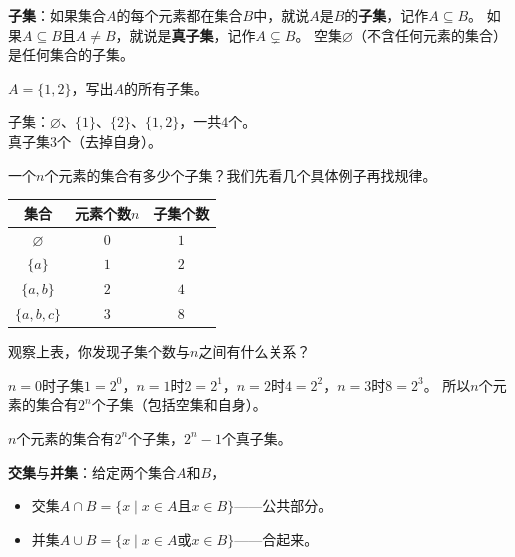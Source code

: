 
\textbf{子集}：如果集合$A$的每个元素都在集合$B$中，就说$A$是$B$的\textbf{子集}，记作$A\subseteq B$。
如果$A\subseteq B$且$A\neq B$，就说是\textbf{真子集}，记作$A\subsetneq B$。
空集$\varnothing$（不含任何元素的集合）是任何集合的子集。

\begin{example}
$A=\{1,2\}$，写出$A$的所有子集。
\end{example}
\begin{solution}
子集：$\varnothing$、$\{1\}$、$\{2\}$、$\{1,2\}$，一共$4$个。\\
真子集$3$个（去掉自身）。
\end{solution}

一个$n$个元素的集合有多少个子集？我们先看几个具体例子再找规律。

\begin{center}
\begin{tabular}{c|c|c}
集合 & 元素个数$n$ & 子集个数 \\ \hline
$\varnothing$ & $0$ & $1$ \\
$\{a\}$ & $1$ & $2$ \\
$\{a,b\}$ & $2$ & $4$ \\
$\{a,b,c\}$ & $3$ & $8$
\end{tabular}
\end{center}

\begin{example}
观察上表，你发现子集个数与$n$之间有什么关系？
\end{example}
\begin{solution}
$n=0$时子集$1=2^0$，$n=1$时$2=2^1$，$n=2$时$4=2^2$，$n=3$时$8=2^3$。
所以$n$个元素的集合有$2^n$个子集（包括空集和自身）。
\end{solution}

$n$个元素的集合有$2^n$个子集，$2^n-1$个真子集。

\begin{center}
\end{center}

\textbf{交集}与\textbf{并集}：给定两个集合$A$和$B$，
\begin{itemize}
\item 交集$A\cap B=\{x\mid x\in A\text{且}x\in B\}$——公共部分。
\item 并集$A\cup B=\{x\mid x\in A\text{或}x\in B\}$——合起来。
\end{itemize}

